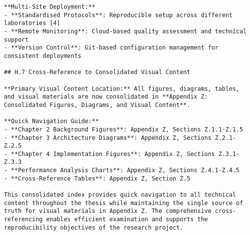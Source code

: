 \begin{verbatim}
**Multi-Site Deployment:**
- **Standardised Protocols**: Reproducible setup across different laboratories [4]
- **Remote Monitoring**: Cloud-based quality assessment and technical support
- **Version Control**: Git-based configuration management for consistent deployments

## H.7 Cross-Reference to Consolidated Visual Content

**Primary Visual Content Location:** All figures, diagrams, tables, and visual materials are now consolidated in **Appendix Z: Consolidated Figures, Diagrams, and Visual Content**.

**Quick Navigation Guide:**
- **Chapter 2 Background Figures**: Appendix Z, Sections Z.1.1-Z.1.5
- **Chapter 3 Architecture Diagrams**: Appendix Z, Sections Z.2.1-Z.2.5
- **Chapter 4 Implementation Figures**: Appendix Z, Sections Z.3.1-Z.3.3
- **Performance Analysis Charts**: Appendix Z, Sections Z.4.1-Z.4.5
- **Cross-Reference Tables**: Appendix Z, Section Z.5

This consolidated index provides quick navigation to all technical content throughout the thesis while maintaining the single source of truth for visual materials in Appendix Z. The comprehensive cross-referencing enables efficient examination and supports the reproducibility objectives of the research project.
\end{verbatim}
